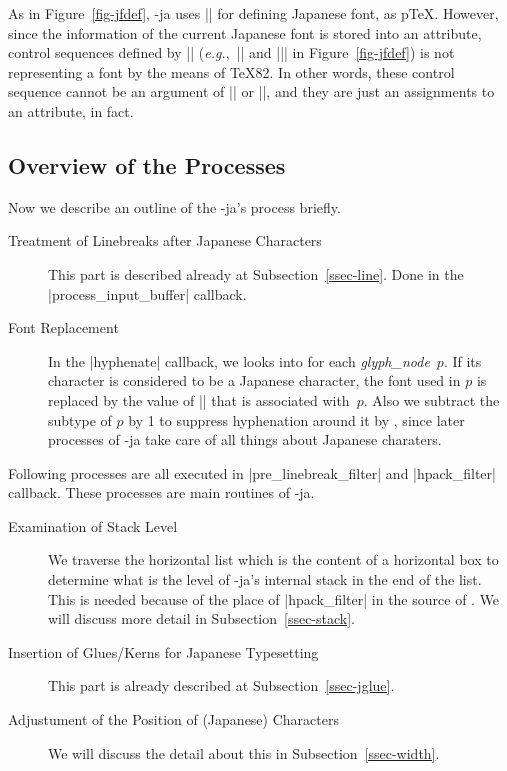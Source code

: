 \documentclass{ajt}
\begin{document}
As in Figure~\ref{fig-jfdef}, \LuaTeX-ja uses |\jfont| for defining
Japanese font, as p\TeX.  However, since the information of the current
Japanese font is stored into an attribute, control sequences defined by
|\jfont| (\emph{e.g.},~|\foo| and |\bar| in Figure~\ref{fig-jfdef}) is
not representing a font by the means of \TeX82. In other words,
these control sequence cannot be an argument of |\the| or |\textfont|,
and they are just an assignments to an attribute, in fact.


\subsection{Overview of the Processes}
Now we describe an outline of the \LuaTeX-ja's process briefly.
\begin{description}
\item[Treatment of Linebreaks after Japanese Characters] This part is
	   described already at Subsection~\ref{ssec-line}. Done in the
	   |process_input_buffer| callback.
\item[Font Replacement] In the |hyphenate| callback, we looks into for
	   each \textit{glyph\_node}~$p$. If its character is considered
	   to be a Japanese character, the font used in $p$ is replaced
	   by the value of |\ltj@curjfnt| that is associated
	   with~$p$. Also we subtract the subtype of $p$ by 1 to
	   suppress hyphenation around it by \LuaTeX, since later
	   processes of \LuaTeX-ja take care of all things about
	   Japanese charaters.
\end{description}
%
Following processes are all executed in |pre_linebreak_filter| and
|hpack_filter| callback. These processes are main routines of \LuaTeX-ja.

\begin{description}
\item[Examination of Stack Level] We traverse the horizontal list which
	   is the content of a horizontal box
to determine what is the level of \LuaTeX-ja's internal stack in the end
	   of the list. This is needed because of the place of
	   |hpack_filter| in the source of \LuaTeX. We will discuss more
	   detail in Subsection~\ref{ssec-stack}.

\item[Insertion of Glues/Kerns for Japanese Typesetting]
This part is already described at Subsection~\ref{ssec-jglue}. 

\item[Adjustument of the Position of (Japanese) Characters]
We will discuss the detail about this in Subsection~\ref{ssec-width}.
\end{description}
\end{document}
